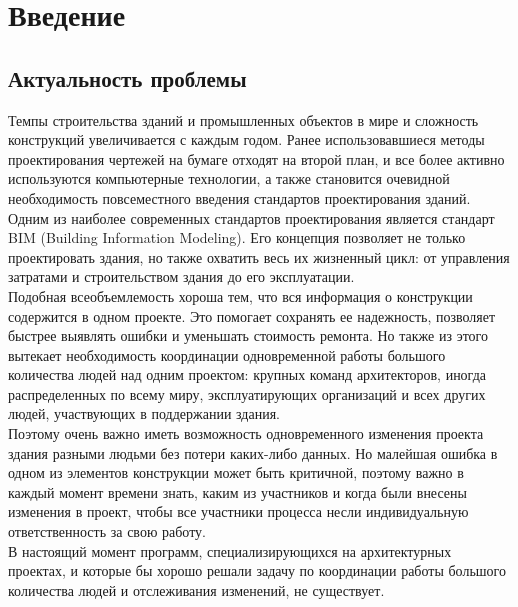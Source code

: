 \documentclass[a4paper,14pt]{extreport} %
\begin{document}
\tableofcontents %


\chapter{Введение}
\section{Актуальность проблемы}
Темпы строительства зданий и промышленных объектов в мире и сложность конструкций увеличивается с каждым годом. Ранее использовавшиеся методы проектирования чертежей на бумаге отходят на второй план, и все более активно используются компьютерные технологии, а также становится очевидной необходимость повсеместного введения стандартов проектирования зданий. \\
Одним из наиболее современных стандартов проектирования является стандарт BIM (Building Information Modeling). Его концепция позволяет не только проектировать здания, но также охватить весь их жизненный цикл: от управления затратами и строительством здания до его эксплуатации. \\
Подобная всеобъемлемость хороша тем, что вся информация о конструкции содержится в одном проекте. Это помогает сохранять ее надежность, позволяет быстрее выявлять ошибки и уменьшать стоимость ремонта. Но также из этого вытекает необходимость координации одновременной работы большого количества людей над одним проектом: крупных команд архитекторов, иногда распределенных по всему миру, эксплуатирующих организаций и всех других людей, участвующих в  поддержании здания. \\
Поэтому очень важно иметь возможность одновременного изменения проекта здания разными людьми без потери каких-либо данных. Но малейшая ошибка в одном из элементов конструкции может быть критичной, поэтому важно в каждый момент времени знать, каким из участников и когда были внесены изменения в проект, чтобы все участники процесса несли индивидуальную ответственность за свою работу. \\
В настоящий момент программ, специализирующихся на архитектурных проектах, и  которые бы хорошо решали задачу по координации работы большого количества людей и отслеживания изменений, не существует. 

\newpage
\end{document}
